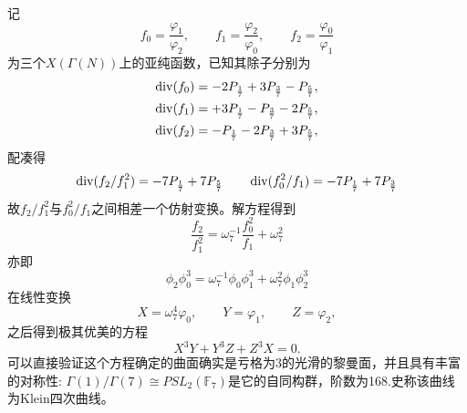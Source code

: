 记$$f_0=\frac{\varphi_1}{\varphi_2}, \qquad f_1=\frac{\varphi_2}{\varphi_0}, \qquad f_2=\frac{\varphi_0}{\varphi_1}$$
为三个$X(\Gamma(N))$上的亚纯函数，已知其除子分别为
\begin{equation*}
\begin{aligned}
\operatorname{\operatorname{div}} (f_0)=-2P_{\frac{1}{7}}+3P_{\frac{3}{7}}-P_{\frac{5}{7}},\\
\operatorname{\operatorname{div}} (f_1)=+3P_{\frac{1}{7}}-P_{\frac{3}{7}}-2P_{\frac{5}{7}},\\
\operatorname{\operatorname{div}} (f_2)=-P_{\frac{1}{7}}-2P_{\frac{3}{7}}+3P_{\frac{5}{7}},
\end{aligned}
\end{equation*}
配凑得
$$\operatorname{\operatorname{div}}(f_2/f_1^2)=-7P_{\frac{1}{7}}+7P_{\frac{5}{7}} \qquad \operatorname{\operatorname{div}}(f_0^2/f_1)=-7P_{\frac{1}{7}}+7P_{\frac{3}{7}}$$
故$f_2/f_1^2$与$f_0^2/f_1$之间相差一个仿射变换。解方程得到
$$\frac{f_2}{f_1^2}= \omega_7^{-1}\frac{f_0^2}{f_1}+\omega_7^2$$
亦即
$$\phi_2\phi_0^3=\omega_7^{-1}\phi_0\phi_1^3 +\omega_7^{2}\phi_1\phi_2^3$$
在线性变换
$$X=\omega_7^4\varphi_0, \qquad Y=\varphi_1, \qquad Z= \varphi_2,$$之后得到极其优美的方程$$X^3Y+Y^3Z+Z^3X=0.$$可以直接验证这个方程确定的曲面确实是亏格为$3$的光滑的黎曼面，并且具有丰富的对称性: $\Gamma(1)/\Gamma(7) \cong PSL_2(\mathbb{F}_7)$是它的自同构群，阶数为168.史称该曲线为Klein四次曲线。
\nocite{nash2014klein}\nocite{hilton1991catalan}\nocite{duke2005continued}
\nocite{green1978on}\nocite{klein1892vorlesungen}\nocite{fricke1897vorlesungen}\nocite{shimura1971introduction}\nocite{shurman1997geometry}\nocite{anvari2009automorphisms}\nocite{mumford1995algebraic}
%
%
